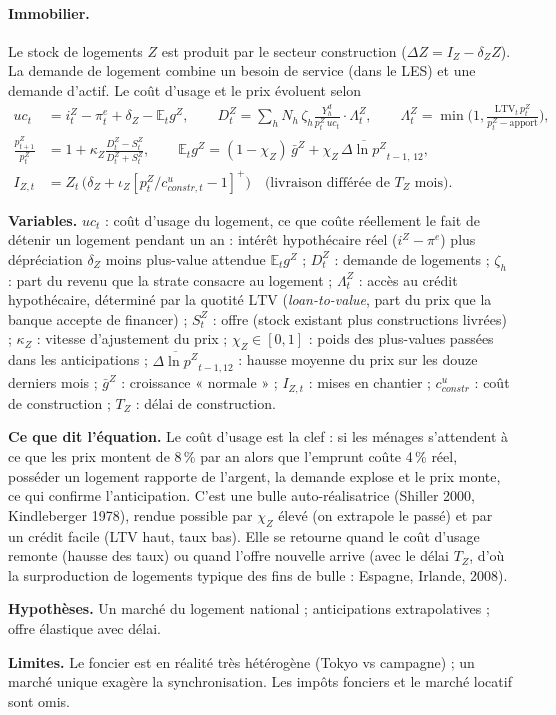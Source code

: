 \documentclass[11pt,a4paper]{article}
\newcommand{\variables}{\par\noindent\textbf{Variables.} }
\newcommand{\sens}{\par\noindent\textbf{Ce que dit l'équation.} }
\newcommand{\hyp}{\par\noindent\textbf{Hypothèses.} }
\newcommand{\limites}{\par\noindent\textbf{Limites.} }
\newcommand{\E}{\mathbb{E}}
\newcommand{\pos}[1]{{\left[#1\right]^{+}}}
\begin{document}
\paragraph{Immobilier.} Le stock de logements $Z$ est produit par le secteur construction ($\Delta Z = I_Z - \delta_Z Z$). La demande de logement combine un besoin de service (dans le LES) et une demande d'actif. Le coût d'usage et le prix évoluent selon
\begin{align}
uc_t &= i^{Z}_t - \pi^e_t + \delta_Z - \E_t g^Z, \qquad
D^Z_t = \sum_h N_h\,\zeta_h \frac{Y^d_h}{p^Z_t\, uc_t} \cdot \Lambda^{Z}_t, \qquad \Lambda^Z_t = \min\Big(1, \frac{\mathrm{LTV}_t\, p^Z_t}{p^Z_t - \text{apport}}\Big), \\
\frac{p^Z_{t+1}}{p^Z_t} &= 1 + \kappa_Z \frac{D^Z_t - S^Z_t}{D^Z_t + S^Z_t}, \qquad
\E_t g^Z = (1-\chi_Z)\, \bar g^Z + \chi_Z\, \overline{\Delta \ln p^Z}_{t-1,\,12},
\label{eq:pz}\\
I_{Z,t} &= Z_t\,\big(\delta_Z + \iota_Z \pos{p^Z_t / c^u_{constr,t} - 1}\big) \quad \text{(livraison différée de } T_Z \text{ mois)}.
\end{align}
\begin{lecture}
\variables $uc_t$ : coût d'usage du logement, ce que coûte réellement le fait de détenir un logement pendant un an : intérêt hypothécaire réel ($i^Z-\pi^e$) plus dépréciation $\delta_Z$ moins plus-value attendue $\E_t g^Z$ ; $D^Z_t$ : demande de logements ; $\zeta_h$ : part du revenu que la strate consacre au logement ; $\Lambda^Z_t$ : accès au crédit hypothécaire, déterminé par la quotité $\mathrm{LTV}$ (\emph{loan-to-value}, part du prix que la banque accepte de financer) ; $S^Z_t$ : offre (stock existant plus constructions livrées) ; $\kappa_Z$ : vitesse d'ajustement du prix ; $\chi_Z\in[0,1]$ : poids des plus-values passées dans les anticipations ; $\overline{\Delta\ln p^Z}_{t-1,12}$ : hausse moyenne du prix sur les douze derniers mois ; $\bar g^Z$ : croissance « normale » ; $I_{Z,t}$ : mises en chantier ; $c^u_{constr}$ : coût de construction ; $T_Z$ : délai de construction.
\sens Le coût d'usage est la clef : si les ménages s'attendent à ce que les prix montent de 8\,\% par an alors que l'emprunt coûte 4\,\% réel, posséder un logement rapporte de l'argent, la demande explose et le prix monte, ce qui confirme l'anticipation. C'est une bulle auto-réalisatrice (Shiller 2000, Kindleberger 1978), rendue possible par $\chi_Z$ élevé (on extrapole le passé) et par un crédit facile (LTV haut, taux bas). Elle se retourne quand le coût d'usage remonte (hausse des taux) ou quand l'offre nouvelle arrive (avec le délai $T_Z$, d'où la surproduction de logements typique des fins de bulle : Espagne, Irlande, 2008).
\hyp Un marché du logement national ; anticipations extrapolatives ; offre élastique avec délai.
\limites Le foncier est en réalité très hétérogène (Tokyo vs campagne) ; un marché unique exagère la synchronisation. Les impôts fonciers et le marché locatif sont omis.
\end{lecture}
\end{document}
